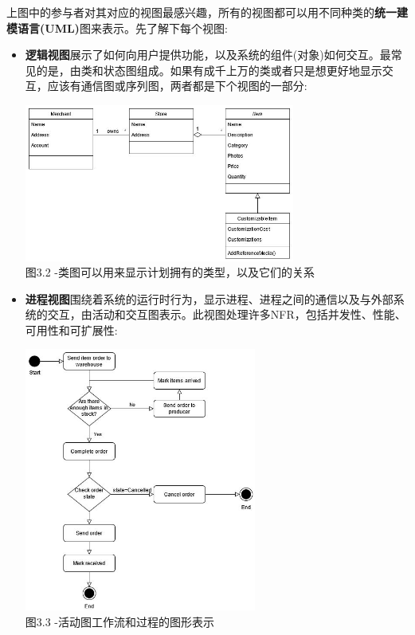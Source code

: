上图中的参与者对其对应的视图最感兴趣，所有的视图都可以用不同种类的\textbf{统一建模语言(UML)}图来表示。先了解下每个视图:

\begin{itemize}
\item 
\textbf{逻辑视图}展示了如何向用户提供功能，以及系统的组件(对象)如何交互。最常见的是，由类和状态图组成。如果有成千上万的类或者只是想更好地显示交互，应该有通信图或序列图，两者都是下个视图的一部分:

\begin{center}
\includegraphics[width=0.7\textwidth]{content/1/chapter3/images/2.jpg}\\
图3.2 -类图可以用来显示计划拥有的类型，以及它们的关系
\end{center}

\item 
\textbf{进程视图}围绕着系统的运行时行为，显示进程、进程之间的通信以及与外部系统的交互，由活动和交互图表示。此视图处理许多NFR，包括并发性、性能、可用性和可扩展性:

\begin{center}
\includegraphics[width=0.6\textwidth]{content/1/chapter3/images/3.jpg}\\
图3.3 -活动图工作流和过程的图形表示
\end{center}


\end{itemize}
